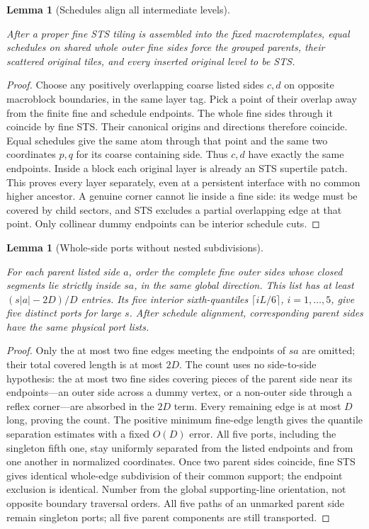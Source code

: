 \documentclass[11pt,a4paper]{article}
\newtheorem{lemma}[definition]{Lemma}
\theoremstyle{remark}
\newcommand{\lean}[1]{}
\newcommand{\uses}[1]{}
\begin{document}
\begin{lemma}[Schedules align all intermediate levels]\label{lem:alignment-tuple}
\lean{Tilings.Alignment.schedule_intermediate_sts}
\uses{def:endpoint-schedule,def:sts}
After a proper fine STS tiling is assembled into the fixed macrotemplates,
equal schedules on shared whole outer fine sides force the grouped parents,
their scattered original tiles, and every inserted original level to be STS.
\end{lemma}
\begin{proof}
Choose any positively overlapping coarse listed sides $c,d$ on opposite
macroblock boundaries, in the same layer tag. Pick a point of their overlap
away from the finite fine and schedule endpoints. The whole fine sides
through it coincide by fine STS. Their canonical origins and directions
therefore coincide. Equal schedules give the same atom through that point
and the same two coordinates $p,q$ for its coarse containing side.
Thus $c,d$ have exactly the same endpoints. Inside a block each original
layer is already an STS supertile patch. This proves every layer separately,
even at a persistent interface with no common higher ancestor.
A genuine corner cannot lie inside a fine side: its wedge must be covered
by child sectors, and STS excludes a partial overlapping edge at that point.
Only collinear dummy endpoints can be interior schedule cuts.
\end{proof}

\begin{lemma}[Whole-side ports without nested subdivisions]\label{lem:whole-ports}
\lean{Tilings.Alignment.whole_side_ports}
\uses{def:mesh,def:endpoint-schedule,lem:alignment-tuple}
For each parent listed side $a$, order the complete fine outer sides whose
closed segments lie strictly inside $sa$, in the same global direction.
This list has at least $(s|a|-2D)/D$ entries. Its five interior sixth-quantiles
$\lceil iL/6\rceil$, $i=1,\ldots,5$, give five distinct ports for large $s$. After schedule
alignment, corresponding parent sides have the same physical port lists.
\end{lemma}
\begin{proof}
Only the at most two fine edges meeting the endpoints of $sa$ are omitted;
their total covered length is at most $2D$. The count uses no side-to-side
hypothesis: the at most two fine sides covering pieces of the parent side
near its endpoints---an outer side across a dummy vertex, or a non-outer side
through a reflex corner---are absorbed in the $2D$ term. Every remaining edge is at most
$D$ long, proving the count. The positive minimum fine-edge length gives
the quantile separation estimates with a fixed $O(D)$ error. All five ports,
including the singleton fifth one, stay uniformly separated from the listed
endpoints and from one another in normalized coordinates.
Once two parent sides coincide, fine STS gives identical whole-edge
subdivision of their common support; the endpoint exclusion is identical.
Number from the global supporting-line orientation, not opposite boundary
traversal orders. All five paths of an unmarked parent side remain singleton
ports; all five parent components are still transported.
\end{proof}
\end{document}
